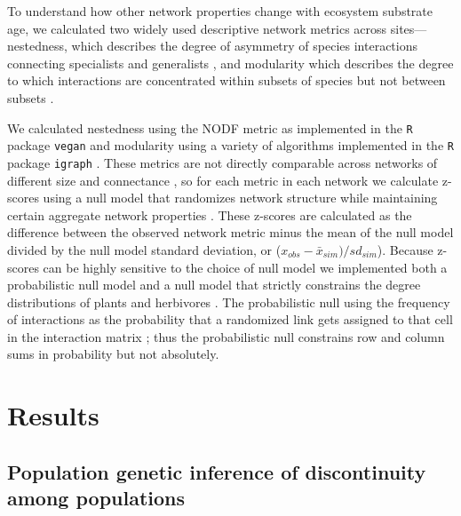 \documentclass[12pt]{article}
\begin{document}
\begin{linenumbers}
To understand how other network properties change with ecosystem
substrate age, we calculated two widely used descriptive network
metrics across sites---nestedness, which describes the degree of
asymmetry of species interactions connecting specialists and
generalists \citep{Bascompte2003, Ulrich2009}, and modularity which
describes the degree to which interactions are concentrated within
subsets of species but not between subsets \citep{Newman2004,
  Olesen2007}.

We calculated nestedness using the NODF metric \citep{nodf} as
implemented in the {\tt R} package {\tt vegan} \citep{vegan} and
modularity using a variety of algorithms implemented in the {\tt R}
package {\tt igraph} \citep{igraph}. These metrics are not directly
comparable across networks of different size and connectance
\citep{Ulrich2009}, so for each metric in each network we calculate
z-scores using a null model that randomizes network structure while
maintaining certain aggregate network properties
\citep{Ulrich2009}. These z-scores are calculated as the difference
between the observed network metric minus the mean of the null model
divided by the null model standard deviation, or
($x_{obs}-\bar{x}_{sim})/sd_{sim}$). Because z-scores can be highly
sensitive to the choice of null model \citep{Ulrich2009} we
implemented both a probabilistic null model \citep{Bascompte2003} and
a null model that strictly constrains the degree distributions of
plants and herbivores \citep{Ulrich2009}. The probabilistic null using
the frequency of interactions as the probability that a randomized
link gets assigned to that cell in the interaction matrix
\citep{Bascompte2003}; thus the probabilistic null constrains row and
column sums in probability but not absolutely.

\section*{Results}

\subsection*{Population genetic inference of discontinuity among
  populations}


\end{linenumbers}
\end{document}
